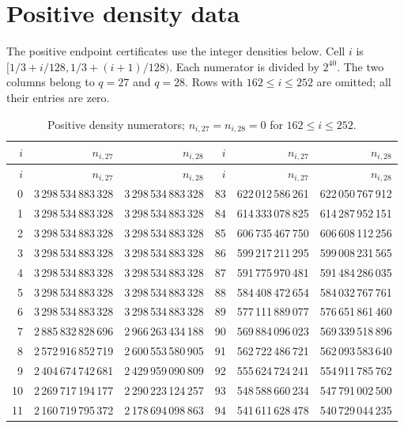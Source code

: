 \appendix
\section{Positive density data}
\label{app:positive-data}
The positive endpoint certificates use the integer densities below. Cell $i$ is $[1/3+i/128,1/3+(i+1)/128)$. Each numerator is divided by $2^{40}$. The two columns belong to $q=27$ and $q=28$. Rows with $162\le i\le252$ are omitted; all their entries are zero.
\small
\renewcommand{\arraystretch}{1.05}
\begin{longtable}{@{}r r r@{\qquad\qquad}r r r@{}}
\caption{Positive density numerators; $n_{i,27}=n_{i,28}=0$ for $162\le i\le252$.}\label{tab:positive-density}\\
\toprule $i$ & $n_{i,27}$ & $n_{i,28}$ & $i$ & $n_{i,27}$ & $n_{i,28}$\\ \midrule
\endfirsthead
\toprule $i$ & $n_{i,27}$ & $n_{i,28}$ & $i$ & $n_{i,27}$ & $n_{i,28}$\\ \midrule
\endhead
0 & 3\,298\,534\,883\,328 & 3\,298\,534\,883\,328 & 83 & 622\,012\,586\,261 & 622\,050\,767\,912\\
1 & 3\,298\,534\,883\,328 & 3\,298\,534\,883\,328 & 84 & 614\,333\,078\,825 & 614\,287\,952\,151\\
2 & 3\,298\,534\,883\,328 & 3\,298\,534\,883\,328 & 85 & 606\,735\,467\,750 & 606\,608\,112\,256\\
3 & 3\,298\,534\,883\,328 & 3\,298\,534\,883\,328 & 86 & 599\,217\,211\,295 & 599\,008\,231\,565\\
4 & 3\,298\,534\,883\,328 & 3\,298\,534\,883\,328 & 87 & 591\,775\,970\,481 & 591\,484\,286\,035\\
5 & 3\,298\,534\,883\,328 & 3\,298\,534\,883\,328 & 88 & 584\,408\,472\,654 & 584\,032\,767\,761\\
6 & 3\,298\,534\,883\,328 & 3\,298\,534\,883\,328 & 89 & 577\,111\,889\,077 & 576\,651\,861\,460\\
7 & 2\,885\,832\,828\,696 & 2\,966\,263\,434\,188 & 90 & 569\,884\,096\,023 & 569\,339\,518\,896\\
8 & 2\,572\,916\,852\,719 & 2\,600\,553\,580\,905 & 91 & 562\,722\,486\,721 & 562\,093\,583\,640\\
9 & 2\,404\,674\,742\,681 & 2\,429\,959\,090\,809 & 92 & 555\,624\,724\,241 & 554\,911\,785\,762\\
10 & 2\,269\,717\,194\,177 & 2\,290\,223\,124\,257 & 93 & 548\,588\,660\,234 & 547\,791\,002\,500\\
11 & 2\,160\,719\,795\,372 & 2\,178\,694\,098\,863 & 94 & 541\,611\,628\,478 & 540\,729\,044\,235\\

\end{longtable}
